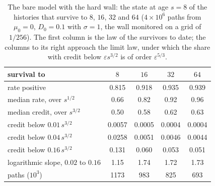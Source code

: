 \begin{table}[ht]
\centering\small
\begin{tabular}{@{}lcccc@{}}
\toprule
survival to & $8$ & $16$ & $32$ & $64$\\
\midrule
rate positive & 0.815 & 0.918 & 0.935 & 0.939\\
median rate, over $s^{1/2}$ & 0.66 & 0.82 & 0.92 & 0.96\\
median credit, over $s^{3/2}$ & 0.50 & 0.58 & 0.62 & 0.63\\
credit below $0.01\,s^{3/2}$ & 0.0057 & 0.0005 & 0.0004 & 0.0004\\
credit below $0.04\,s^{3/2}$ & 0.0258 & 0.0051 & 0.0046 & 0.0044\\
credit below $0.16\,s^{3/2}$ & 0.131 & 0.060 & 0.053 & 0.051\\
logarithmic slope, $0.02$ to $0.16$ & 1.15 & 1.74 & 1.72 & 1.73\\
paths ($10^3$) & 1173 & 983 & 825 & 693\\
\bottomrule
\end{tabular}
\caption{\small The bare model with the hard wall: the state at age
$s=8$ of the histories that survive to $8$, $16$, $32$ and $64$
($4\times10^6$ paths from $\mu_0=0$, $D_0=0.1$ with $\sigma=1$, the wall
monitored on a grid of $1/256$). The first column is the law of the
survivors to date; the columns to its right approach the limit law, under
which the share with credit below $\varepsilon s^{3/2}$ is of order
$\varepsilon^{5/3}$.}
\label{tab:bare}
\end{table}
